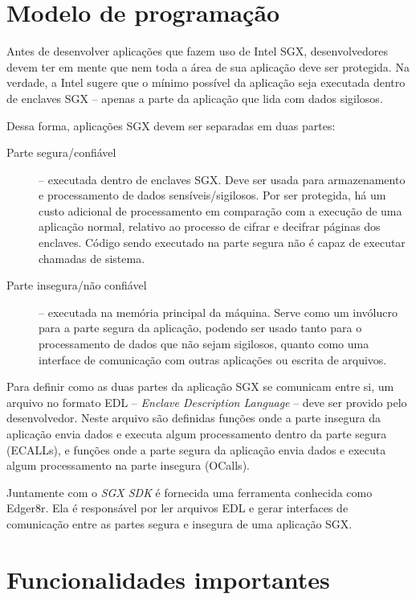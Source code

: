 \section{Modelo de programação}
\label{sec:sgx_modelo_programacao}

Antes de desenvolver aplicações que fazem uso de Intel SGX, desenvolvedores
devem ter em mente que nem toda a área de sua aplicação deve ser protegida. Na
verdade, a Intel sugere que o mínimo possível da aplicação seja executada dentro
de enclaves SGX -- apenas a parte da aplicação que lida com dados sigilosos.

Dessa forma, aplicações SGX devem ser separadas em duas partes:

\begin{description}
    \item [Parte segura/confiável] -- executada dentro de enclaves SGX. Deve ser
    usada para armazenamento e processamento de dados sensíveis/sigilosos.
    Por ser protegida, há um custo adicional de processamento em comparação com
    a execução de uma aplicação normal, relativo ao processo de cifrar e
    decifrar páginas dos enclaves. Código sendo executado na parte segura não é
    capaz de executar chamadas de sistema.

    \item [Parte insegura/não confiável] -- executada na memória principal da
    máquina. Serve como um invólucro para a parte segura da aplicação, podendo
    ser usado tanto para o processamento de dados que não sejam sigilosos,
    quanto como uma interface de comunicação com outras aplicações ou escrita de
    arquivos.
\end{description}

Para definir como as duas partes da aplicação SGX se comunicam entre si, um
arquivo no formato EDL -- \textit{Enclave Description Language} -- deve ser
provido pelo desenvolvedor. Neste arquivo são definidas funções onde a parte
insegura da aplicação envia dados e executa algum processamento dentro da parte
segura (ECALLs), e funções onde a parte segura da aplicação envia dados e
executa algum processamento na parte insegura (OCalls).

Juntamente com o \textit{SGX SDK} é fornecida uma ferramenta conhecida como
Edger8r. Ela é responsável por ler arquivos EDL e gerar interfaces de
comunicação entre as partes segura e insegura de uma aplicação SGX.

\section{Funcionalidades importantes}
\label{sec:sgx_funcionalidades}

